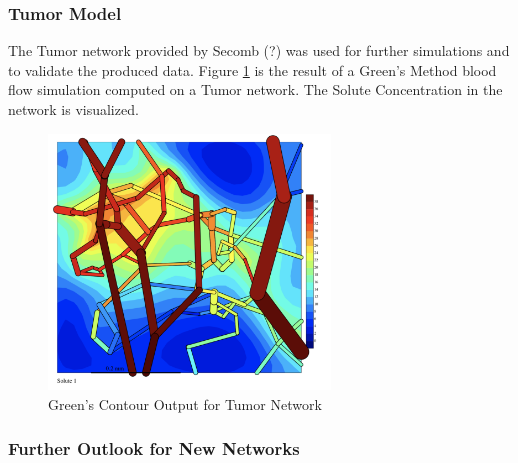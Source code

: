 \subsubsection*{Tumor Model}

The Tumor network provided by Secomb (?) was used for further simulations and to validate the produced data.
Figure \ref{fig:Contour_Tumor}  is the result of a Green's Method blood flow simulation computed on a Tumor network. The Solute Concentration in the network is visualized.\\
\begin{figure}[h]
\centering
\includegraphics[width=75mm]{Contour_Tumor}
\caption{\footnotesize Green's Contour Output for Tumor Network}
\label{fig:Contour_Tumor}
\end{figure}

\subsubsection*{Further Outlook for New Networks}

